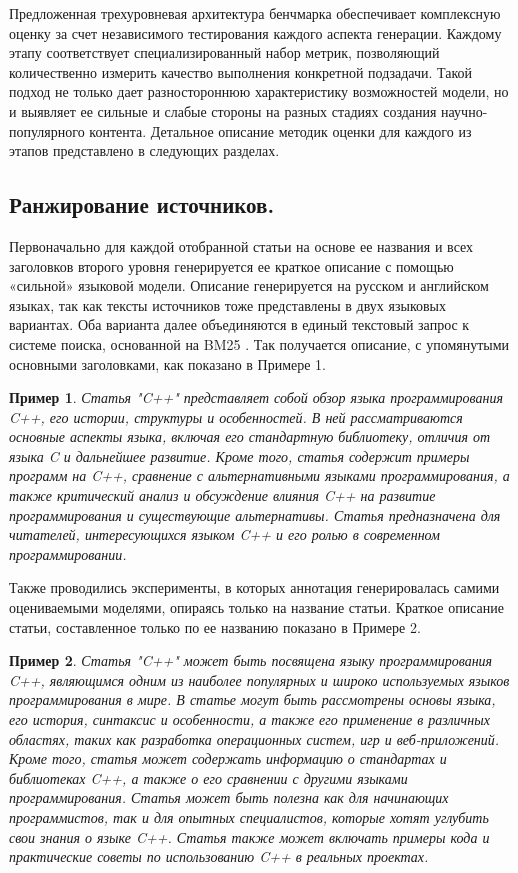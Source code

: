 \documentclass{article}
\theoremstyle{definition}
\theoremstyle{plain}
\newtheorem{remark}{Пример}
\begin{document}
Предложенная трехуровневая архитектура бенчмарка обеспечивает комплексную оценку за счет независимого тестирования каждого аспекта генерации. 
Каждому этапу соответствует специализированный набор метрик, позволяющий количественно измерить качество выполнения конкретной подзадачи. 
Такой подход не только дает разностороннюю характеристику возможностей модели, но и выявляет ее сильные и слабые стороны на разных стадиях создания научно-популярного контента. 
Детальное описание методик оценки для каждого из этапов представлено в следующих разделах.
\subsection*{Ранжирование источников.}
Первоначально для каждой отобранной статьи на основе ее названия и всех заголовков второго уровня генерируется ее краткое описание с помощью «сильной» языковой модели. 
Описание генерируется на русском и английском языках, так как тексты источников тоже представлены в двух языковых вариантах. 
Оба варианта далее объединяются в единый текстовый запрос к системе поиска, основанной на BM25 . Так получается описание, с упомянутыми основными заголовками, как показано в Примере 1.
\begin{remark}
Статья "C++" представляет собой обзор языка программирования C++, его истории, структуры и особенностей. 
В ней рассматриваются основные аспекты языка, включая его стандартную библиотеку, отличия от языка C и дальнейшее развитие. 
Кроме того, статья содержит примеры программ на C++, сравнение с альтернативными языками программирования, а также критический анализ и обсуждение влияния C++ на развитие программирования и существующие альтернативы. 
Статья предназначена для читателей, интересующихся языком C++ и его ролью в современном программировании.
\end{remark}

Также проводились эксперименты, в которых аннотация генерировалась самими оцениваемыми моделями, опираясь только на название статьи. Краткое описание статьи, составленное только по ее названию показано в Примере 2.
\begin{remark}
Статья "C++" может быть посвящена языку программирования C++, являющимся одним из наиболее популярных и широко используемых языков программирования в мире.
В статье могут быть рассмотрены основы языка, его история, синтаксис и особенности, а также его применение в различных областях, таких как разработка операционных систем, игр и веб-приложений. 
Кроме того, статья может содержать информацию о стандартах и библиотеках C++, а также о его сравнении с другими языками программирования. 
Статья может быть полезна как для начинающих программистов, так и для опытных специалистов, которые хотят углубить свои знания о языке C++.
Статья также может включать примеры кода и практические советы по использованию C++ в реальных проектах. 
\end{remark}
\end{document}
